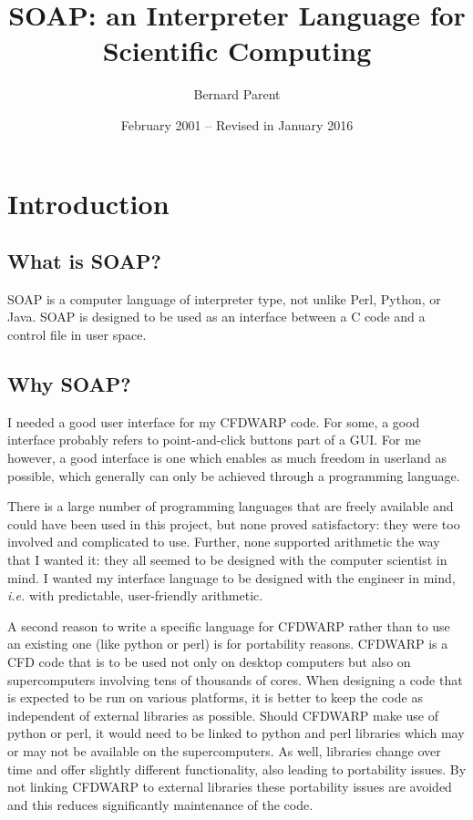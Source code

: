 \documentclass{warpdoc}
\author{
  Bernard Parent
}
\title{
  SOAP: an Interpreter Language for Scientific Computing
}
\date{
  February 2001 -- Revised in January 2016
}
\begin{document}
  \pagestyle{headings}
  \setcounter{page}{1}
  \makewarpdoctitle
  \tableofcontents

\sloppy

\section{Introduction}

\subsection{What is SOAP?}

SOAP is a computer language of interpreter type, not unlike Perl, Python, or
Java. SOAP is designed to be used as an interface between a
C code and a control file in user space.

\subsection{Why SOAP?}

I needed a good user interface for my CFDWARP code. For some, a good
interface probably refers to point-and-click buttons part of a GUI.
For me however, a good interface is one which enables as much freedom
in userland as possible, which generally can only be achieved
through a programming language.

There is a large number of programming languages that are freely available
and could have been used in this project, but none proved satisfactory: they were
too involved and complicated to use. Further, none supported arithmetic the way that
I wanted it: they all seemed to be designed with the computer scientist
in mind. I wanted my interface language to be designed
with the engineer in mind, {\it i.e.} with predictable, user-friendly
arithmetic.

A second reason to write a specific language for CFDWARP rather than to use an existing one (like python or perl) is for portability reasons. CFDWARP is a CFD code that is to be used not only on desktop computers but also on supercomputers involving tens of thousands of cores. When designing a code that is expected to be run on various platforms, it is better to keep the code as independent of external libraries as possible. Should CFDWARP make use of python or perl, it would need to be linked to python and perl libraries which may or may not be available on the supercomputers. As well, libraries change over time and offer slightly different functionality, also leading to portability issues. By not linking CFDWARP to external libraries these portability issues are avoided and this reduces significantly maintenance of the code.
\end{document}
